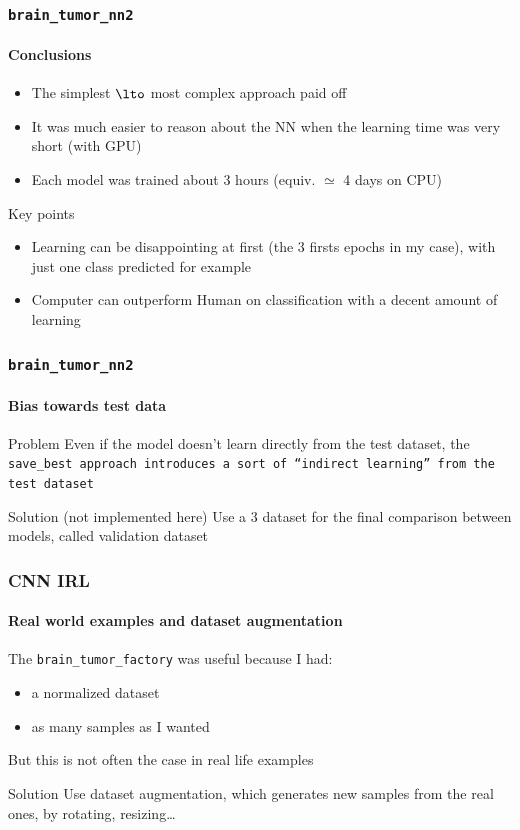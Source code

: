\documentclass[]{beamer}
\newcommand{\btf}{\tt{brain\_tumor\_factory}}
\newcommand{\btnt}{\tt{brain\_tumor\_nn2}}
\begin{document}
\begin{frame}
  \frametitle{\btnt}
  \framesubtitle{Conclusions}
  \begin{itemize}
    \item The \alert{simplest} $\lto$ \alert{most complex} approach paid off
    \item It was much easier to reason about the NN when the learning time was very short (with GPU)
    \item Each model was trained about \alert{3 hours} (equiv. $\simeq$ 4 days on CPU)
  \end{itemize}

  \begin{block}{Key points}
    \begin{itemize}
      \item Learning can be disappointing at first (the 3 firsts epochs in my case), with just one class predicted for example
      \item Computer can outperform Human on classification with a decent amount of learning
    \end{itemize}
  \end{block}
\end{frame}

\begin{frame}
  \frametitle{\btnt}
  \framesubtitle{Bias towards test data}
  \begin{block}{Problem}
    Even if the model doesn't learn directly from the test dataset, the \tt{save\_best} approach introduces a sort of ``indirect learning'' from the test dataset
  \end{block}

  \begin{exampleblock}{Solution (not implemented here)}
    Use a 3 dataset for the final comparison between models, called \alert{validation dataset}
  \end{exampleblock}
\end{frame}

\begin{frame}
  \frametitle{CNN IRL}
  \framesubtitle{Real world examples and dataset augmentation}
  The \alert{\btf} was useful because I had:
  \begin{itemize}
    \item a normalized dataset
    \item as many samples as I wanted
  \end{itemize}

  But this is not often the case in real life examples

  \begin{exampleblock}{Solution}
    Use dataset augmentation, which generates new samples from the real ones, by rotating, resizing\ldots{}
  \end{exampleblock}
\end{frame}
\end{document}
